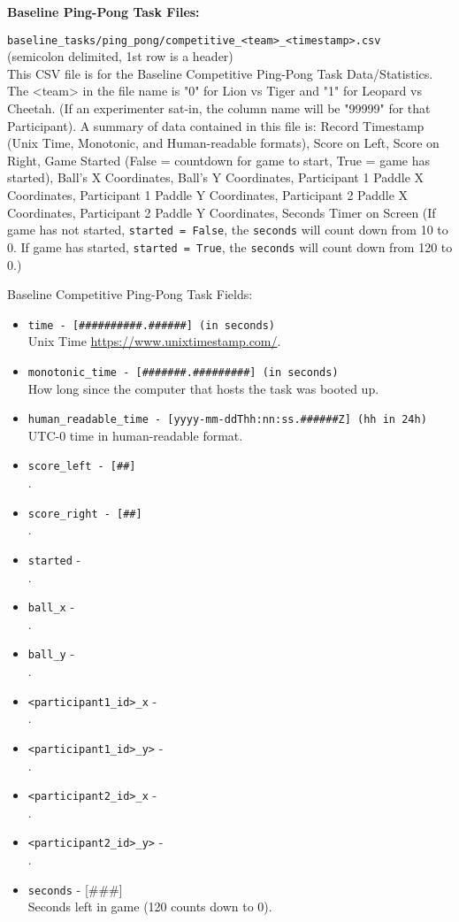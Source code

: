 \begin{description}
\bigskip\item\textbf{Baseline Ping-Pong Task Files:}
\medskip
\item\verb|baseline_tasks/ping_pong/competitive_<team>_<timestamp>.csv|\\(semicolon delimited, 1st row is a header)\\
This CSV file is for the Baseline Competitive Ping-Pong Task Data/Statistics. The <team> in the file name is "0" for Lion vs Tiger and "1" for Leopard vs Cheetah. (If an experimenter sat-in, the column name will be "99999" for that Participant). A summary of data contained in this file is: Record Timestamp (Unix Time, Monotonic, and Human-readable formats), Score on Left, Score on Right, Game Started (False = countdown for game to start, True = game has started), Ball's X Coordinates, Ball's Y Coordinates, Participant 1 Paddle X Coordinates, Participant 1 Paddle Y Coordinates, Participant 2 Paddle X Coordinates, Participant 2 Paddle Y Coordinates, Seconds Timer on Screen (If game has not started, \verb|started = False|, the \verb|seconds| will count down from 10 to 0. If game has started, \verb|started = True|, the \verb|seconds| will count down from 120 to 0.)

Baseline Competitive Ping-Pong Task Fields:
\begin{itemize}
    \item \verb|time - [##########.######] (in seconds)|\\Unix Time \href{https://www.unixtimestamp.com/}{https://www.unixtimestamp.com/}.
    \item \verb|monotonic_time - [#######.#########] (in seconds)|\\How long since the computer that hosts the task was booted up.
    \item \verb|human_readable_time - [yyyy-mm-ddThh:nn:ss.######Z] (hh in 24h)|\\ UTC-0 time in human-readable format.
    \item \verb|score_left - [##]|\\.
    \item \verb|score_right - [##]|\\.
    \item \verb|started| - \\.
    \item \verb|ball_x| - \\.
    \item \verb|ball_y| - \\.
    \item \verb|<participant1_id>_x| -\\.
    \item \verb|<participant1_id>_y>| -\\.
    \item \verb|<participant2_id>_x| -\\.
    \item \verb|<participant2_id>_y>| -\\.
    \item \verb|seconds| - [\#\#\#]\\Seconds left in game (120 counts down to 0).
\end{itemize}



\end{description}

